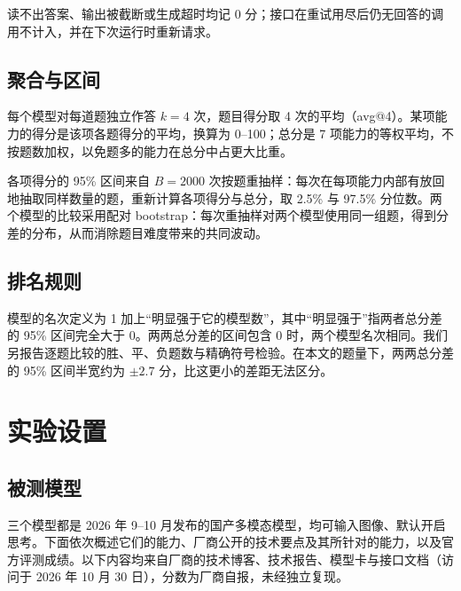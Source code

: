 \documentclass[11pt,a4paper,fontset=none]{ctexart}
\begin{document}
读不出答案、输出被截断或生成超时均记 0 分；接口在重试用尽后仍无回答的调用不计入，并在下次运行时重新请求。

\subsection{聚合与区间}

每个模型对每道题独立作答 $k=4$ 次，题目得分取 4 次的平均（avg@4）。某项能力的得分是该项各题得分的平均，换算为 0--100；总分是 7 项能力的等权平均，不按题数加权，以免题多的能力在总分中占更大比重。

各项得分的 95\% 区间来自 $B=2000$ 次按题重抽样：每次在每项能力内部有放回地抽取同样数量的题，重新计算各项得分与总分，取 2.5\% 与 97.5\% 分位数。两个模型的比较采用配对 bootstrap：每次重抽样对两个模型使用同一组题，得到分差的分布，从而消除题目难度带来的共同波动。

\subsection{排名规则}

模型的名次定义为 1 加上“明显强于它的模型数”，其中“明显强于”指两者总分差的 95\% 区间完全大于 0。两两总分差的区间包含 0 时，两个模型名次相同。我们另报告逐题比较的胜、平、负题数与精确符号检验。在本文的题量下，两两总分差的 95\% 区间半宽约为 $\pm 2.7$ 分，比这更小的差距无法区分。

\section{实验设置}
\label{sec:setup}

\subsection{被测模型}
\label{sec:models}

三个模型都是 2026 年 9--10 月发布的国产多模态模型，均可输入图像、默认开启思考。下面依次概述它们的能力、厂商公开的技术要点及其所针对的能力，以及官方评测成绩。以下内容均来自厂商的技术博客、技术报告、模型卡与接口文档（访问于 2026 年 10 月 30 日），分数为厂商自报，未经独立复现。
\end{document}
